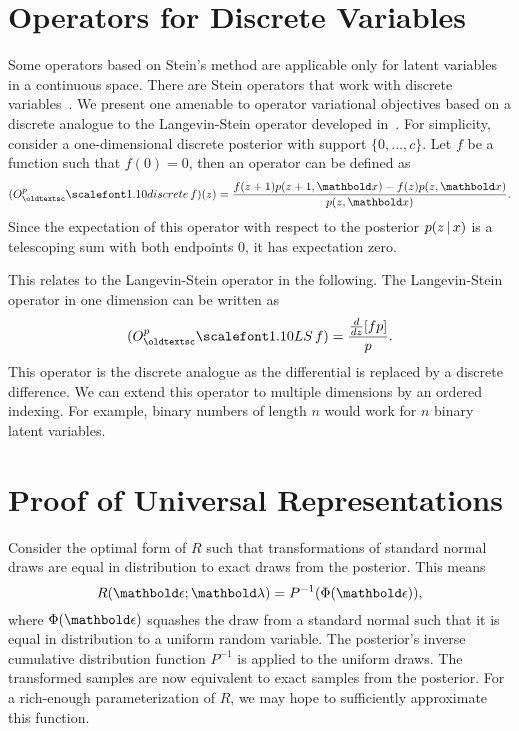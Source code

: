 \section{Operators for Discrete Variables}
\label{sec:discrete_vars}
Some operators based on Stein's method
are applicable only for latent variables in a continuous space. There are Stein
operators that work with discrete variables~\citep{Assaraf:1999,Ley:2011b}.
We present one amenable to operator variational objectives based on a discrete analogue to the Langevin-Stein operator developed in~\cite{Ley:2011b}. For simplicity, consider a one-dimensional
discrete posterior with support $\{0, ..., c\}$. Let $f$ be a function
such that $f(0) = 0$, then an operator can be defined as
\begin{align*}
(O^{p}_\textsc{discrete} \, f)(z) = \frac{f(z + 1) p(z + 1, \mbx) - f(z) p(z , \mbx)}{p(z, \mbx)}.
\end{align*}
Since the expectation of this operator with respect to the posterior $p(z \, | \, x)$
is a telescoping sum with both endpoints $0$,
it has expectation zero.

This relates to the Langevin-Stein operator in the following. The Langevin-Stein operator in one dimension can be written as
\begin{align*}
(O^{p}_\textsc{LS}  \, f)  =  \frac{\frac{d}{dz}[f p]}{p}.
\end{align*}
This operator is the discrete analogue as the differential is replaced by
a discrete difference. We can extend this operator to multiple dimensions
by an ordered indexing. For example, binary numbers of length $n$ would work for $n$ binary
latent variables.





\section{Proof of Universal Representations}
\label{sec:universal_representation}

Consider the optimal form of $R$ such that transformations of standard
normal draws are equal in distribution to exact draws from the
posterior. This means
\begin{equation*}
R(\mbepsilon;\mblambda) = P^{-1}(\Phi(\mbepsilon)),
\end{equation*}
where $\Phi(\mbepsilon)$ squashes the draw from a standard normal such that it
is equal in distribution to a uniform random variable. The posterior's inverse cumulative distribution function $P^{-1}$ is applied to the uniform draws. The transformed samples are now equivalent to exact samples
from the posterior. For a rich-enough parameterization of $R$, we may hope
to sufficiently approximate this function.

